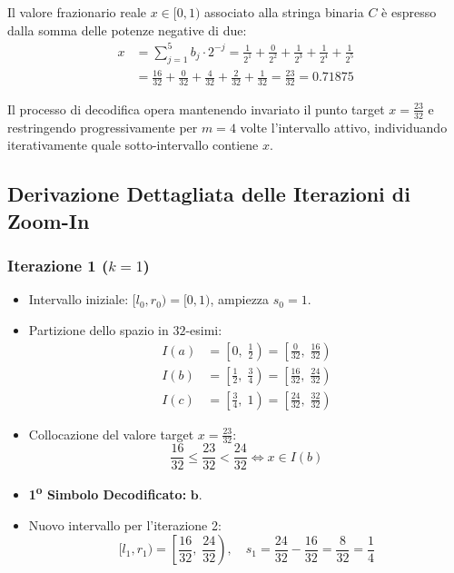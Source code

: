 Il valore frazionario reale $x \in [0, 1)$ associato alla stringa binaria $C$ \`e espresso dalla somma delle potenze negative di due:
\begin{align}
  x &= \sum_{j=1}^{5} b_j \cdot 2^{-j} = \frac{1}{2^1} + \frac{0}{2^2} + \frac{1}{2^3} + \frac{1}{2^4} + \frac{1}{2^5} \nonumber \\
    &= \frac{16}{32} + \frac{0}{32} + \frac{4}{32} + \frac{2}{32} + \frac{1}{32} = \frac{23}{32} = 0.71875
\end{align}

Il processo di decodifica opera mantenendo invariato il punto target $x = \frac{23}{32}$ e restringendo progressivamente per $m = 4$ volte l'intervallo attivo, individuando iterativamente quale sotto-intervallo contiene $x$.

\FloatBarrier
\subsection{Derivazione Dettagliata delle Iterazioni di Zoom-In}
\label{subsec:derivazione-iterazioni-zoom}

\subsubsection*{Iterazione 1 ($k = 1$)}
\begin{itemize}
  \item Intervallo iniziale: $[l_0, r_0) = [0, 1)$, ampiezza $s_0 = 1$.
  \item Partizione dello spazio in $32$-esimi:
  \begin{align}
    I(a) &= \left[ 0, \; \frac{1}{2} \right) = \left[ \frac{0}{32}, \; \frac{16}{32} \right) \\
    I(b) &= \left[ \frac{1}{2}, \; \frac{3}{4} \right) = \left[ \frac{16}{32}, \; \frac{24}{32} \right) \\
    I(c) &= \left[ \frac{3}{4}, \; 1 \right) = \left[ \frac{24}{32}, \; \frac{32}{32} \right)
  \end{align}
  \item Collocazione del valore target $x = \frac{23}{32}$:
  \begin{equation}
    \frac{16}{32} \le \frac{23}{32} < \frac{24}{32} \iff x \in I(b)
  \end{equation}
  \item \textbf{1\textsuperscript{o} Simbolo Decodificato:} $\mathbf{b}$.
  \item Nuovo intervallo per l'iterazione 2:
  \begin{equation}
    [l_1, r_1) = \left[ \frac{16}{32}, \; \frac{24}{32} \right), \quad s_1 = \frac{24}{32} - \frac{16}{32} = \frac{8}{32} = \frac{1}{4}
  \end{equation}
\end{itemize}

